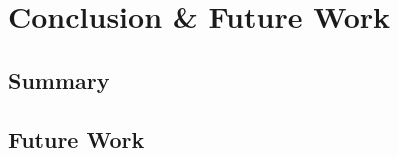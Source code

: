 \chapter{Conclusion \& Future Work}
\label{ch:conclusion}
\section{Summary}
\label{sec:summary}
\section{Future Work}
\label{sec:futurework}